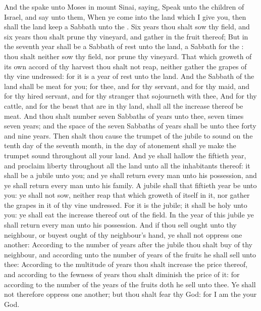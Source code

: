 \begin{biblechapter} %
 And the \LORD spake unto Moses in mount Sinai, saying,
\verse Speak unto the children of Israel, and say unto them, When ye come into the land which I give you, then shall the land keep a Sabbath unto the \LORD.
\verse Six years thou shalt sow thy field, and six years thou shalt prune thy vineyard, and gather in the fruit thereof;
\verse But in the seventh year shall be a Sabbath of rest unto the land, a Sabbath for the \LORD: thou shalt neither sow thy field, nor prune thy vineyard.
\verse That which groweth of its own accord of thy harvest thou shalt not reap, neither gather the grapes of thy vine undressed: for it is a year of rest unto the land.
\verse And the Sabbath of the land shall be meat for you; for thee, and for thy servant, and for thy maid, and for thy hired servant, and for thy stranger that sojourneth with thee,
\verse And for thy cattle, and for the beast that are in thy land, shall all the increase thereof be meat.
 And thou shalt number seven Sabbaths of years unto thee, seven times seven years; and the space of the seven Sabbaths of years shall be unto thee forty and nine years.
\verse Then shalt thou cause the trumpet of the jubile to sound on the tenth day of the seventh month, in the day of atonement shall ye make the trumpet sound throughout all your land.
\verse And ye shall hallow the fiftieth year, and proclaim liberty throughout all the land unto all the inhabitants thereof: it shall be a jubile unto you; and ye shall return every man unto his possession, and ye shall return every man unto his family.
\verse A jubile shall that fiftieth year be unto you: ye shall not sow, neither reap that which groweth of itself in it, nor gather the grapes in it of thy vine undressed.
\verse For it is the jubile; it shall be holy unto you: ye shall eat the increase thereof out of the field.
\verse In the year of this jubile ye shall return every man unto his possession.
\verse And if thou sell ought unto thy neighbour, or buyest ought of thy neighbour's hand, ye shall not oppress one another:
\verse According to the number of years after the jubile thou shalt buy of thy neighbour, and according unto the number of years of the fruits he shall sell unto thee:
\verse According to the multitude of years thou shalt increase the price thereof, and according to the fewness of years thou shalt diminish the price of it: for according to the number of the years of the fruits doth he sell unto thee.
\verse Ye shall not therefore oppress one another; but thou shalt fear thy God: for I am the \LORD your God.

\end{biblechapter}
